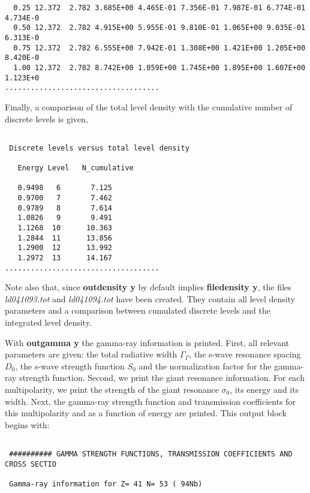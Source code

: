 \begin{samplecase}
{\begin{verbatim}
  0.25 12.372  2.782 3.685E+00 4.465E-01 7.356E-01 7.987E-01 6.774E-01 4.734E-0
  0.50 12.372  2.782 4.915E+00 5.955E-01 9.810E-01 1.065E+00 9.035E-01 6.313E-0
  0.75 12.372  2.782 6.555E+00 7.942E-01 1.308E+00 1.421E+00 1.205E+00 8.420E-0
  1.00 12.372  2.782 8.742E+00 1.059E+00 1.745E+00 1.895E+00 1.607E+00 1.123E+0
....................................
\end{verbatim} } \renewcommand{\baselinestretch}{1.07}\small\normalsize
\noindent
Finally, a comparison of the total level 
density with the cumulative number of discrete levels is given,

{\small \begin{verbatim}

 Discrete levels versus total level density
 
   Energy Level   N_cumulative
                                                   
   0.9498   6       7.125 
   0.9700   7       7.462
   0.9789   8       7.614
   1.0826   9       9.491
   1.1268  10      10.363
   1.2844  11      13.856
   1.2900  12      13.992
   1.2972  13      14.167
....................................
\end{verbatim} } \renewcommand{\baselinestretch}{1.07}\small\normalsize
\noindent
Note also that, since {\bf outdensity y} by default implies {\bf filedensity y},
the files {\it ld041093.tot} and  {\it ld041094.tot} have been created. They
contain all level density parameters and a comparison between cumulated 
discrete levels and the integrated level density.

With {\bf outgamma y} the gamma-ray information is printed. 
First, all relevant parameters are given: the total radiative width 
$\Gamma_{\Gamma}$, the s-wave resonance spacing $D_{0}$, 
the s-wave strength function $S_{0}$ and the normalization factor for the
gamma-ray strength function. Second, we print the giant resonance information.
For each multipolarity, we print the strength of the giant resonance
$\sigma_{0}$, its energy and its width.
Next, the gamma-ray strength function and transmission coefficients for this 
multipolarity and as a function of energy are printed.
This output block begins with:

{\small \begin{verbatim}

 ########## GAMMA STRENGTH FUNCTIONS, TRANSMISSION COEFFICIENTS AND CROSS SECTIO
   
 Gamma-ray information for Z= 41 N= 53 ( 94Nb)
   

\end{verbatim}}
\end{samplecase}
